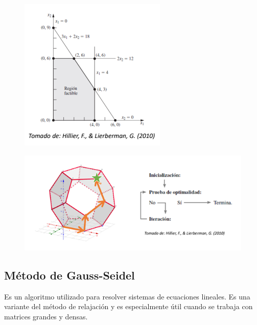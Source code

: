 \documentclass[conference]{IEEEtran}
\begin{document}
\begin{figure}[H]
    \begin{center}
        \includegraphics[width=.7\linewidth]{./Images/MetodoSimplex.png}
        \caption{}
    \end{center}
\end{figure}

\begin{figure}[H]
    \begin{center}
        \includegraphics[width=\linewidth]{./Images/MetodoSimplex2.png}
        \caption{}
    \end{center}
\end{figure}

\subsection{Método de Gauss-Seidel}

Es un algoritmo utilizado para resolver sistemas de ecuaciones lineales. Es
una variante del método de relajación y es especialmente útil cuando se
trabaja con matrices grandes y densas.
\end{document}
